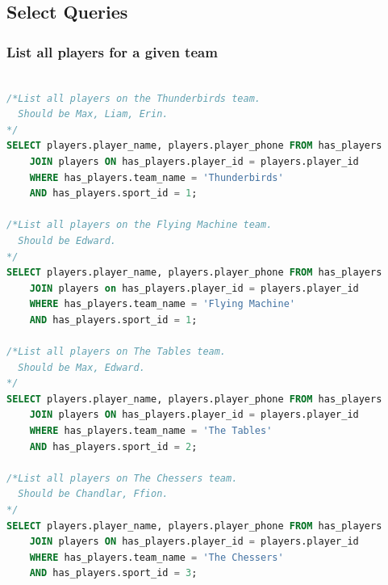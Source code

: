 \documentclass[11pt, article]{article}
\begin{document}
	\subsection{Select Queries}
	
	\subsubsection{List all players for a given team}
	\begin{lstlisting}[language=sql]
	
/*List all players on the Thunderbirds team.
  Should be Max, Liam, Erin.
*/
SELECT players.player_name, players.player_phone FROM has_players 
	JOIN players ON has_players.player_id = players.player_id 
	WHERE has_players.team_name = 'Thunderbirds' 
	AND has_players.sport_id = 1;

/*List all players on the Flying Machine team.
  Should be Edward.
*/
SELECT players.player_name, players.player_phone FROM has_players 
	JOIN players on has_players.player_id = players.player_id
	WHERE has_players.team_name = 'Flying Machine' 
	AND has_players.sport_id = 1;

/*List all players on The Tables team.
  Should be Max, Edward.
*/
SELECT players.player_name, players.player_phone FROM has_players 
	JOIN players ON has_players.player_id = players.player_id
	WHERE has_players.team_name = 'The Tables' 
	AND has_players.sport_id = 2;

/*List all players on The Chessers team.
  Should be Chandlar, Ffion.
*/
SELECT players.player_name, players.player_phone FROM has_players 
	JOIN players ON has_players.player_id = players.player_id
	WHERE has_players.team_name = 'The Chessers' 
	AND has_players.sport_id = 3;

\end{lstlisting}
\newpage
\end{document}
